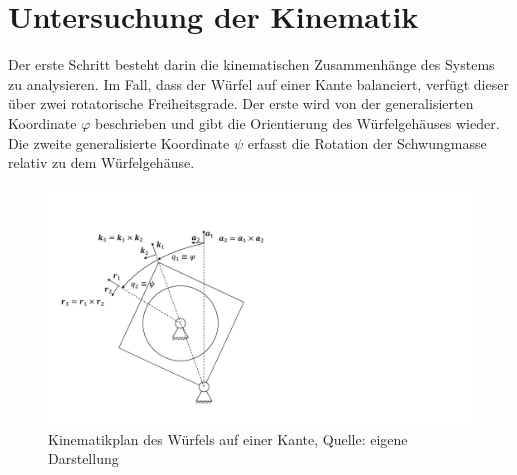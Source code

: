 \section{Untersuchung der Kinematik}
Der erste Schritt besteht darin die kinematischen Zusammenhänge des Systems zu analysieren. Im Fall, dass der Würfel auf einer Kante balanciert, verfügt dieser über zwei rotatorische Freiheitsgrade. Der erste wird von der generalisierten Koordinate $\varphi$ beschrieben und gibt die Orientierung des Würfelgehäuses wieder. Die zweite generalisierte Koordinate $\psi$ erfasst die Rotation der Schwungmasse relativ zu dem Würfelgehäuse.
\begin{figure}[!ht]
\centering
\includegraphics[width=0.6\linewidth, trim={1cm 1.5cm 18cm 3.5cm}, clip]{img/ModellWuerfelseite}
\caption{Kinematikplan des Würfels auf einer Kante, Quelle: eigene Darstellung}
\label{skizze_dynamik_edge}
\end{figure}

